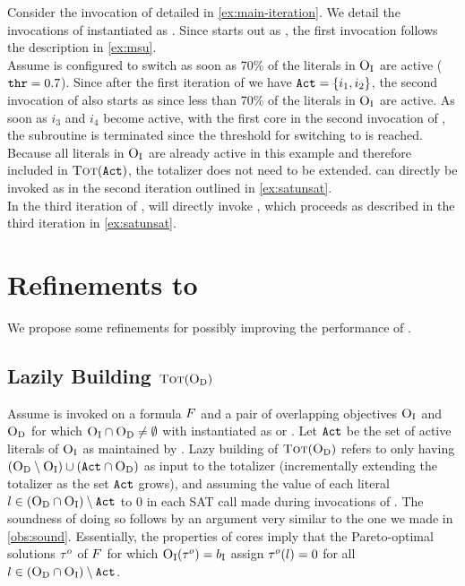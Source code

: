 \begin{example}
  Consider the invocation of \algname{} detailed in \cref{ex:main-iteration}.
  We detail the invocations of \Min{} instantiated as \msh{}.
  Since \msh{} starts out as \msu{}, the first invocation follows the description in \cref{ex:msu}. \\
  Assume \msh{} is configured to switch as soon as 70\% of the literals in $\textsc{O}_{\text{I}}$ are active ($\texttt{thr} = 0.7$).
  Since after the first iteration of \algname{} we have $\texttt{Act} = \{i_1, i_2\}$, the second invocation of \msh{} also starts as \msu{} since less than 70\% of the literals in $\textsc{O}_{\text{I}}$ are active.
  As soon as $i_3$ and $i_4$ become active, with the first core in the second invocation of \msu{}, the \msu{} subroutine is terminated since the threshold for switching to \satunsat{} is reached.
  Because all literals in $\textsc{O}_{\text{I}}$ are already active in this example and therefore included in $\textsc{Tot}(\texttt{Act})$, the totalizer does not need to be extended.
  \satunsat{} can directly be invoked as in the second iteration outlined in \cref{ex:satunsat}. \\
  In the third iteration of \algname{}, \msh{} will directly invoke \satunsat{}, which proceeds as described in the third iteration in \cref{ex:satunsat}.
\end{example}

\section{Refinements to \algname{}\label{sec:refinements}}

We propose some refinements for possibly improving the performance of \algname{}.

\subsection{Lazily Building $\textsc{Tot}(\textsc{O}_{\text{D}})$}

Assume \algname{} is invoked on a formula $F$ and a pair of overlapping objectives $\textsc{O}_{\text{I}}$ and $\textsc{O}_{\text{D}}$ for which $\textsc{O}_{\text{I}} \cap \textsc{O}_{\text{D}} \neq \emptyset$ with \Min{} instantiated as \msu{} or \oll{}.
Let $\texttt{Act}$ be the set of active literals of $\textsc{O}_{\text{I}}$ as maintained by \Min{}.
Lazy building of $\textsc{Tot}(\textsc{O}_{\text{D}})$ refers to only having $(\textsc{O}_{\text{D}} \setminus \textsc{O}_{\text{I}}) \cup  (\texttt{Act} \cap \textsc{O}_{\text{D}})$ as input to the totalizer (incrementally extending the totalizer as the set $\texttt{Act}$ grows), and assuming the value of each literal $l \in (\textsc{O}_{\text{D}} \cap \textsc{O}_{\text{I}}) \setminus \texttt{Act}$ to $0$ in each SAT call made during invocations of \Simpr{}.
The soundness of doing so follows by an argument very similar to the one we made in \cref{obs:sound}.
Essentially, the properties of cores imply that the Pareto-optimal solutions $\tau^o$ of $F$ for which $\textsc{O}_{\text{I}}(\tau^o) = b_{\text{I}}$ assign $\tau^o(l) = 0$ for all  $l \in (\textsc{O}_{\text{D}} \cap \textsc{O}_{\text{I}}) \setminus \texttt{Act}$. 

